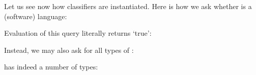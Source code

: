\documentclass{llncs}
\begin{document}




\noindent
Let us see now how classifiers are instantiated. Here is how we ask
whether  is a (software) language:


\noindent
Evaluation of this query literally returns `true':


\noindent
Instead, we may also ask for all types of :


\noindent
{} has indeed a number of types:


\end{document}

